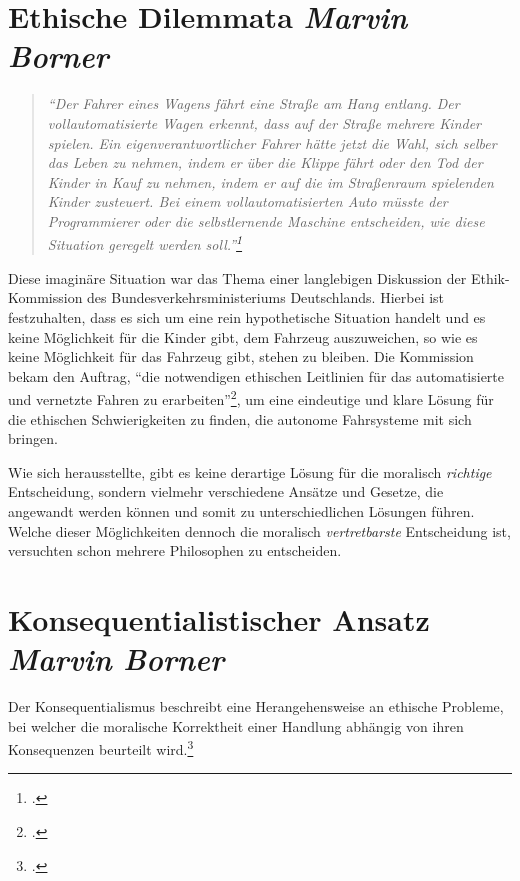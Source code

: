 \documentclass[a4paper, 12pt, openany]{book}
\newcommand\Section[2]{\section[#1 {\scriptsize\itshape#2}]{#1 \footnotesize\itshape#2}}
\begin{document}
        \Section{Ethische Dilemmata}{Marvin Borner} \label{dilemmata}
            \begin{quote} 
                \centering 
                \textit{\enquote{Der Fahrer eines Wagens fährt eine Straße am Hang entlang. Der vollautomatisierte Wagen erkennt,
                dass auf der Straße mehrere Kinder spielen. Ein eigenverantwortlicher Fahrer hätte jetzt die Wahl, sich
                selber das Leben zu nehmen, indem er über die Klippe fährt oder den Tod der Kinder in Kauf zu
                nehmen, indem er auf die im Straßenraum spielenden Kinder zusteuert. Bei einem vollautomatisierten Auto
                müsste der Programmierer oder die selbstlernende Maschine entscheiden, wie diese Situation geregelt werden
                soll.}\footcite[16]{ethikkommission}}
            \end{quote}\par
            Diese imaginäre Situation war das Thema einer langlebigen Diskussion der Ethik-Kommission des Bundesverkehrsministeriums Deutschlands. Hierbei ist festzuhalten, dass es sich um eine rein hypothetische Situation handelt und es keine Möglichkeit für die Kinder gibt, dem Fahrzeug auszuweichen, so wie es keine Möglichkeit für das Fahrzeug gibt, stehen zu bleiben. Die Kommission bekam den Auftrag, \enquote{die notwendigen ethischen Leitlinien für das automatisierte und vernetzte Fahren zu erarbeiten}\footcite[7]{ethikkommission}, um eine eindeutige und klare Lösung für die ethischen Schwierigkeiten zu finden, die autonome Fahrsysteme mit sich bringen.\par
            Wie sich herausstellte, gibt es keine derartige Lösung für die moralisch \textit{richtige} Entscheidung, sondern vielmehr verschiedene Ansätze und Gesetze, die angewandt werden können und somit zu unterschiedlichen Lösungen führen. Welche dieser Möglichkeiten dennoch die moralisch \textit{vertretbarste} Entscheidung ist, versuchten schon mehrere Philosophen zu entscheiden.
        
        \Section{Konsequentialistischer Ansatz}{Marvin Borner}
            Der Konsequentialismus beschreibt eine Herangehensweise an ethische Probleme, bei welcher die moralische Korrektheit einer Handlung abhängig von ihren Konsequenzen beurteilt wird.\footcite[133]{panza2011ethik}
\end{document}
